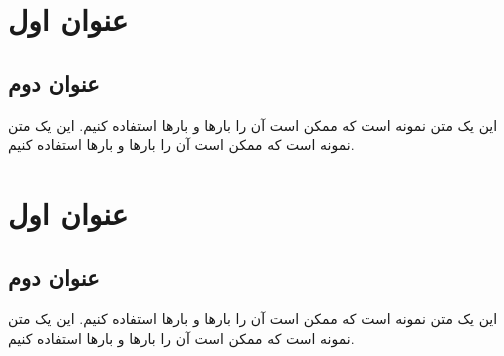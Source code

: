 \documentclass[twoside]{article}
\begin{document}
\newcommand\sample{%
این یک متن نمونه است که ممکن است آن را بارها و بارها استفاده کنیم. %
}
\section{عنوان اول}
\subsection{عنوان دوم}
\sample \sample
\newpage
\section{عنوان اول}
\subsection{عنوان دوم}
\sample \sample
\end{document}

